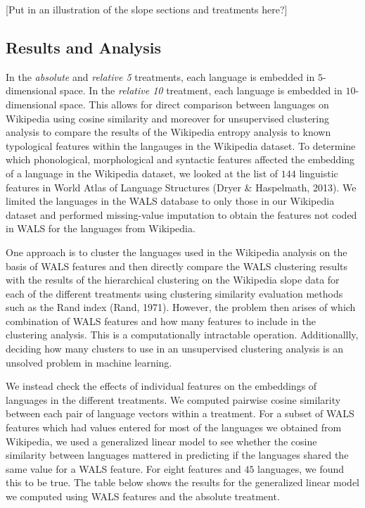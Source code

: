 \documentclass[10pt, letterpaper]{article}
\begin{document}
{[}Put in an illustration of the slope sections and treatments here?{]}

\subsection{Results and Analysis}\label{results-and-analysis}

In the \emph{absolute} and \emph{relative 5} treatments, each language
is embedded in \(5\)-dimensional space. In the \emph{relative 10}
treatment, each language is embedded in \(10\)-dimensional space. This
allows for direct comparison between languages on Wikipedia using cosine
similarity and moreover for unsupervised clustering analysis to compare
the results of the Wikipedia entropy analysis to known typological
features within the langauges in the Wikipedia dataset. To determine
which phonological, morphological and syntactic features affected the
embedding of a language in the Wikipedia dataset, we looked at the list
of \(144\) linguistic features in World Atlas of Language Structures
(Dryer \& Haspelmath, 2013). We limited the languages in the WALS
database to only those in our Wikipedia dataset and performed
missing-value imputation to obtain the features not coded in WALS for
the languages from Wikipedia.

One approach is to cluster the languages used in the Wikipedia analysis
on the basis of WALS features and then directly compare the WALS
clustering results with the results of the hierarchical clustering on
the Wikipedia slope data for each of the different treatments using
clustering similarity evaluation methods such as the Rand index (Rand,
1971). However, the problem then arises of which combination of WALS
features and how many features to include in the clustering analysis.
This is a computationally intractable operation. Additionallly, deciding
how many clusters to use in an unsupervised clustering analysis is an
unsolved problem in machine learning.

We instead check the effects of individual features on the embeddings of
languages in the different treatments. We computed pairwise cosine
similarity between each pair of language vectors within a treatment. For
a subset of WALS features which had values entered for most of the
languages we obtained from Wikipedia, we used a generalized linear model
to see whether the cosine similarity between languages mattered in
predicting if the languages shared the same value for a WALS feature.
For eight features and \(45\) languages, we found this to be true. The
table below shows the results for the generalized linear model we
computed using WALS features and the absolute treatment.
\end{document}
